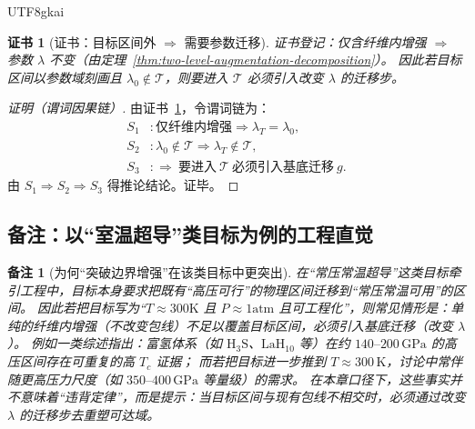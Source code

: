 \documentclass[12pt]{article}
\newtheorem{remark}{备注}[section]
\newtheorem{Certificate}{证书}[section]
\begin{document}
\begin{CJK*}{UTF8}{gkai}
\begin{Certificate}[证书：目标区间外 $\Rightarrow$ 需要参数迁移]
\label{cert:need-boundary-shift-for-out-of-envelope-goal}
证书登记：仅含纤维内增强 $\Rightarrow$ 参数 $\lambda$ 不变（由定理~\ref{thm:two-level-augmentation-decomposition}）。
因此若目标区间以参数域刻画且 $\lambda_0\notin\mathcal{T}$，则要进入 $\mathcal{T}$ 必须引入改变 $\lambda$ 的迁移步。
\end{Certificate}

\begin{proof}[证明（谓词因果链）]
由证书~\ref{cert:need-boundary-shift-for-out-of-envelope-goal}，令谓词链为：
\[
\begin{aligned}
  S_1 &: \text{仅纤维内增强}\Rightarrow \lambda_T=\lambda_0,\\
  S_2 &: \lambda_0\notin\mathcal{T}\Rightarrow \lambda_T\notin\mathcal{T},\\
  S_3 &: \Rightarrow\ \text{要进入}\ \mathcal{T}\ \text{必须引入基底迁移}\ g.
\end{aligned}
\]
由 $S_1\Rightarrow S_2\Rightarrow S_3$ 得推论结论。证毕。
\end{proof}

\subsection{备注：以“室温超导”类目标为例的工程直觉}
\label{sec:room-temperature-superconductivity-remark}

\begin{remark}[为何“突破边界增强”在该类目标中更突出]
在“常压常温超导”这类目标牵引工程中，目标本身要求把既有“高压可行”的物理区间迁移到“常压常温可用”的区间。
因此若把目标写为“$T\approx 300\text{K}$ 且 $P\approx 1\text{atm}$ 且可工程化”，则常见情形是：单纯的纤维内增强（不改变包线）不足以覆盖目标区间，必须引入基底迁移（改变 $\lambda$）。
例如一类综述指出：富氢体系（如 $\mathrm{H_3S}$、$\mathrm{LaH_{10}}$ 等）在约 $140\text{--}200\,\mathrm{GPa}$ 的高压区间存在可重复的高 $T_c$ 证据；
而若把目标进一步推到 $T\approx 300\,\mathrm{K}$，讨论中常伴随更高压力尺度（如 $350\text{--}400\,\mathrm{GPa}$ 等量级）的需求。
在本章口径下，这些事实并不意味着“违背定律”，而是提示：当目标区间与现有包线不相交时，必须通过改变 $\lambda$ 的迁移步去重塑可达域\cite{ref_nsr_nwae047}。
\end{remark}


\end{CJK*}
\end{document}
